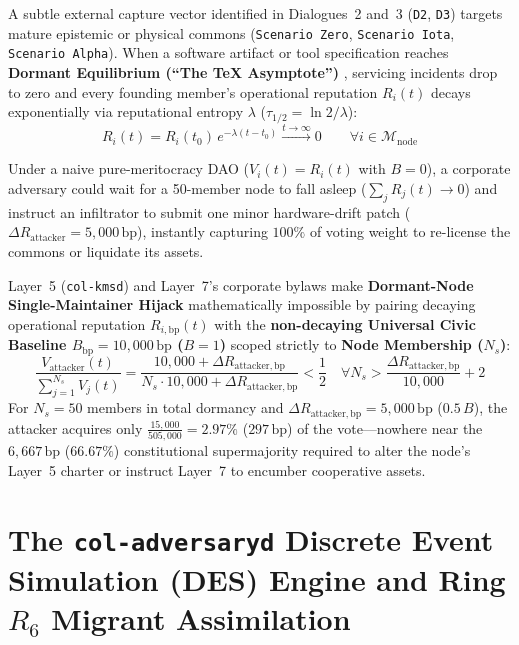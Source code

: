 A subtle external capture vector identified in Dialogues~2 and~3 (\texttt{D2}, \texttt{D3}) targets mature epistemic or physical commons (\texttt{Scenario Zero}, \texttt{Scenario Iota}, \texttt{Scenario Alpha}). When a software artifact or tool specification reaches \textbf{Dormant Equilibrium (``The \TeX{} Asymptote'')} \parencite{knuth1984tex}, servicing incidents drop to zero and every founding member's operational reputation $R_i(t)$ decays exponentially via reputational entropy $\lambda$ ($\tau_{1/2} = \ln 2 / \lambda$):
\begin{equation}
R_i(t) = R_i(t_0)\,e^{-\lambda(t - t_0)} \xrightarrow{t \to \infty} 0 \qquad \forall i \in \mathcal{M}_{\mathrm{node}}
\label{eq:ch10-entropy-decay}
\end{equation}

Under a naive pure-meritocracy DAO ($V_i(t) = R_i(t)$ with $B = 0$), a corporate adversary could wait for a 50-member node to fall asleep ($\sum_j R_j(t) \to 0$) and instruct an infiltrator to submit one minor hardware-drift patch ($\Delta R_{\mathrm{attacker}} = 5{,}000\,\mathrm{bp}$), instantly capturing $100\%$ of voting weight to re-license the commons or liquidate its assets.

Layer~5 (\texttt{col-kmsd}) and Layer~7's corporate bylaws make \textbf{Dormant-Node Single-Maintainer Hijack} mathematically impossible by pairing decaying operational reputation $R_{i,\mathrm{bp}}(t)$ with the \textbf{non-decaying Universal Civic Baseline $B_{\mathrm{bp}} = 10{,}000\,\mathrm{bp}$ ($B = 1$)} scoped strictly to \textbf{Node Membership ($N_s$)}:
\begin{equation}
\frac{V_{\mathrm{attacker}}(t)}{\sum_{j=1}^{N_s} V_j(t)} = \frac{10{,}000 + \Delta R_{\mathrm{attacker,bp}}}{N_s \cdot 10{,}000 + \Delta R_{\mathrm{attacker,bp}}} < \frac{1}{2} \quad \forall N_s > \frac{\Delta R_{\mathrm{attacker,bp}}}{10{,}000} + 2
\label{eq:ch10-anti-capture-bound}
\end{equation}
For $N_s = 50$ members in total dormancy and $\Delta R_{\mathrm{attacker,bp}} = 5{,}000\,\mathrm{bp}$ ($0.5\,B$), the attacker acquires only $\frac{15{,}000}{505{,}000} = 2.97\%$ ($297\,\mathrm{bp}$) of the vote---nowhere near the $6{,}667\,\mathrm{bp}$ ($66.67\%$) constitutional supermajority required to alter the node's Layer~5 charter or instruct Layer~7 to encumber cooperative assets.

\section{The \texttt{col-adversaryd} Discrete Event Simulation (DES) Engine and Ring $R_6$ Migrant Assimilation}
\label{sec:l7-des-engine}


